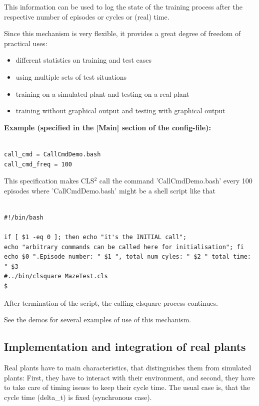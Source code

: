 \documentclass[a4paper,12pt,german]{article}
\newcommand{\cls}{{CLS$^2$ }}
\newcommand{\ite}{\begin{itemize}}
\newcommand{\eti}{\end{itemize}}
\begin{document}
This information can be used to log the state of the training process after the respective
number of episodes or cycles or (real) time.

Since this mechanism is very flexible, it provides a great degree of freedom of practical
uses:

\ite
\item different statistics on training and test cases
\item using multiple sets of test situations 
\item training on a simulated plant and testing on a real plant
\item training without graphical output and testing with graphical output
\eti

{\bf Example (specified in the [Main] section of the config-file):} 

\begin{footnotesize}
\begin{verbatim}

call_cmd = CallCmdDemo.bash
call_cmd_freq = 100

\end{verbatim}
\end{footnotesize}

This specification makes \cls call the command 'CallCmdDemo.bash' every 100 episodes
where 'CallCmdDemo.bash' might be a shell script like that

\begin{footnotesize}
\begin{verbatim}

#!/bin/bash

if [ $1 -eq 0 ]; then echo "it's the INITIAL call"; 
echo "arbitrary commands can be called here for initialisation"; fi
echo $0 ".Episode number: " $1 ", total num cyles: " $2 " total time: " $3
#../bin/clsquare MazeTest.cls
$
\end{verbatim}
\end{footnotesize}


After termination of the script, the calling clsquare process continues.

See the demos for several examples of use of this mechanism.

\subsection{Implementation and integration of real plants}

Real plants have to main characteristics, that distinguishes them from
simulated plants: First, they have to interact with their environment,
and second, they have to take care of timing issues to keep their
cycle time. The usual case is, that the cycle time (delta\_t) is fixed
(synchronous case).
\end{document}
